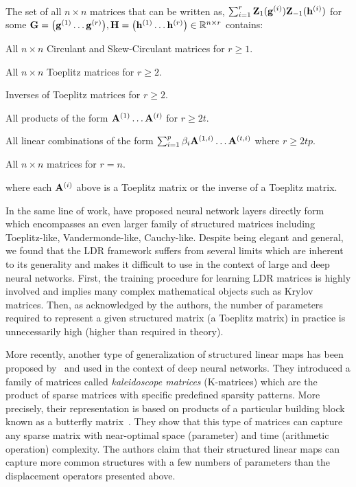\begin{theorem} ~\\
  The set of all $n \times n$ matrices that can be written as, $\sum_{i=1}^{r} \mathbf{Z}_1(\mathbf{g}^{(i)}) \mathbf{Z}_{-1}(\mathbf{h}^{(i)})$
  for some $\Gmat = \leftmat \gvec^{(1)} \ldots \gvec^{(r)} \rightmat,
  \Hmat = \leftmat \hvec^{(1)} \ldots \hvec^{(r)} \rightmat \in \Rbb^{n \times r}$ contains:
  \begin{compactitem}
    \item All $n \times n$ Circulant and Skew-Circulant matrices for $r \geq 1$.
    \item All $n \times n$ Toeplitz matrices for $r \geq 2$.
    \item Inverses of Toeplitz matrices for $r \geq 2$.
    \item All products of the form $\mathbf{A}^{(1)} \ldots \mathbf{A}^{(t)}$ for $r \geq 2t$.
    \item All linear combinations of the form $\sum_{i=1}^p \beta_i \mathbf{A}^{(1, i)} \ldots \mathbf{A}^{(t, i)}$ where $r \geq 2tp$.
    \item All $n\times n$ matrices for $r=n$.
  \end{compactitem}
  where each $\mathbf{A}^{(i)}$ above is a Toeplitz matrix or the inverse of a Toeplitz matrix. 
\end{theorem}
\noindent
In the same line of work, \citet{thomas2018learning} have proposed neural network layers directly form  which encompasses an even larger family of structured matrices including Toeplitz-like, Vandermonde-like, Cauchy-like.
Despite being elegant and general, we found that the LDR framework suffers from several limits which are inherent to its generality and makes it difficult to use in the context of large and deep neural networks.
First, the training procedure for learning LDR matrices is highly involved and implies many complex mathematical objects such as Krylov matrices.
Then, as acknowledged by the authors, the number of parameters required to represent a given structured matrix (a Toeplitz matrix) in practice is unnecessarily high (higher than required in theory). 


More recently, another type of generalization of structured linear maps has been proposed by~\citet{dao2020kaleidoscope} and used in the context of deep neural networks.
They introduced a family of matrices called \emph{kaleidoscope matrices} (K-matrices) which are the product of sparse matrices with specific predefined sparsity patterns.
More precisely, their representation is based on products of a particular building block known as a butterfly matrix~\cite{parker1995random,dao2019learning}.
They show that this type of matrices can capture any sparse matrix with near-optimal space (parameter) and time (arithmetic operation) complexity.
The authors claim that their structured linear maps can capture more common structures with a few numbers of parameters than the displacement operators presented above.


